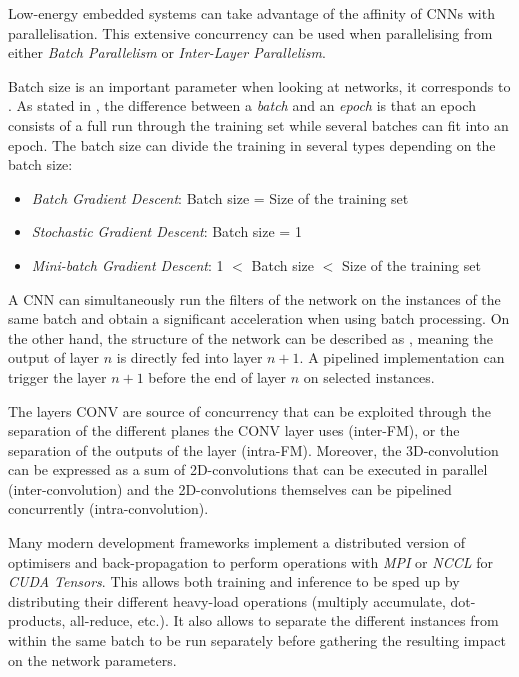Low-energy embedded systems can take advantage of the affinity of CNNs with parallelisation. This extensive concurrency can be used when parallelising from either \emph{Batch Parallelism} or \emph{Inter-Layer Parallelism}.

Batch size is an important parameter when looking at networks, it corresponds to  \cite{MLMastery2019}. As stated in \cite{MLMastery2019}, the difference between a \emph{batch} and an \emph{epoch} is that an epoch consists of a full run through the training set while several batches can fit into an epoch. The batch size can divide the training in several types depending on the batch size:

\begin{itemize}
	\item \emph{Batch Gradient Descent}: Batch size = Size of the training set
	\item \emph{Stochastic Gradient Descent}: Batch size = 1
	\item \emph{Mini-batch Gradient Descent}: 1 $<$ Batch size $<$ Size of the training set
\end{itemize}

A CNN can simultaneously run the filters of the network on the instances of the same batch and obtain a significant acceleration when using batch processing. On the other hand, the structure of the network can be described as , meaning the output of layer $n$ is directly fed into layer $n+1$. A pipelined implementation can trigger the layer $n+1$ before the end of layer $n$ on selected instances.

The layers CONV are source of concurrency that can be exploited through the separation of the different planes the CONV layer uses (inter-FM), or the separation of the outputs of the layer (intra-FM). Moreover, the 3D-convolution can be expressed as a sum of 2D-convolutions that can be executed in parallel (inter-convolution) and the 2D-convolutions themselves can be pipelined concurrently (intra-convolution).

Many modern development frameworks implement a distributed version of optimisers and back-propagation to perform operations with \emph{MPI} or \emph{NCCL} for \emph{CUDA Tensors}. This allows both training and inference to be sped up by distributing their different heavy-load operations (multiply accumulate, dot-products, all-reduce, etc.). It also allows to separate the different instances from within the same batch to be run separately before gathering the resulting impact on the network parameters.

